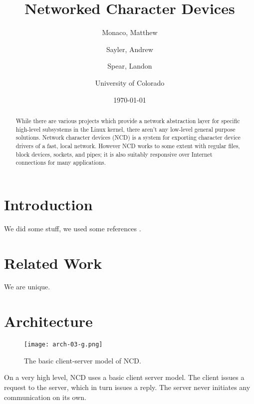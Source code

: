 \documentclass[11pt,twocolumn]{article}
\begin{document}
\title{Networked Character Devices}
\author{Monaco, Matthew \and Sayler, Andrew \and Spear, Landon
  \\ \and University of Colorado}
\date{\today}

\maketitle

\begin{abstract}
While there are various projects which provide a network abstraction layer for
specific high-level subsystems in the Linux kernel, there aren't any low-level
general purpose solutions. Network character devices (NCD) is a system for
exporting character device drivers of a fast, local network. However NCD works
to some extent with regular files, block devices, sockets, and pipes; it is also
suitably responsive over Internet connections for many applications.
\end{abstract}


\section{Introduction}
\label{sec:introduction}

We did some stuff, we used some references \cite{ldd3}.

\section{Related Work}
\label{sec:relatedwork}

We are unique.


\section{Architecture}
\label{sec:architecture}

\begin{figure}[h]
  \begin{center}
    \texttt{[image: arch-03-g.png]}
  \end{center}
  \caption{The basic client-server model of NCD.}
  \label{fig:architecture}
\end{figure}

On a very high level, NCD uses a basic client server model. The client
issues a request to the server, which in turn issues a reply. The
server never initiates any communication on its own.
\end{document}

